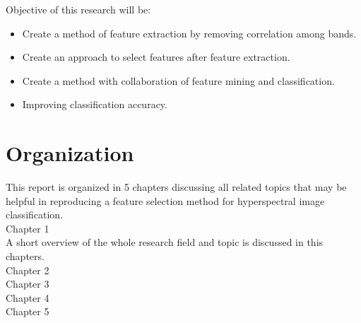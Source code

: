 \documentclass[document.tex]{subfiles}
\begin{document}
Objective of this research will be:
\begin{itemize}
	\item Create a method of feature extraction by removing correlation among bands.
	\item Create an approach to select features after feature extraction.
	\item Create a method with collaboration of feature mining and classification.
	\item Improving classification accuracy.
\end{itemize}

\section{Organization}
\noindent This report is organized in 5 chapters discussing all related topics that may be helpful in reproducing a feature selection method for hyperspectral image classification.\\
Chapter 1\\
A short overview of the whole research field and topic is discussed in this chapters.\\
Chapter 2\\
Chapter 3\\
Chapter 4\\
Chapter 5\\
 
\end{document}
